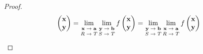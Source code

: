 \documentclass[dvipdfmx]{jsarticle}
\begin{document}
\begin{proof}
\begin{align*}
{\begin{pmatrix}
\mathbf{x} \\
\mathbf{y} \\
\end{pmatrix}} = \lim_{\scriptsize \begin{matrix} \mathbf{x} \rightarrow \mathbf{a} \\ R \rightarrow T \end{matrix}}{\lim_{\scriptsize \begin{matrix} \mathbf{y} \rightarrow \mathbf{b} \\ S \rightarrow T \end{matrix}}{f\begin{pmatrix}
\mathbf{x} \\
\mathbf{y} \\
\end{pmatrix}}} = \lim_{\scriptsize \begin{matrix} \mathbf{y} \rightarrow \mathbf{b} \\ S \rightarrow T \end{matrix}}{\lim_{\scriptsize \begin{matrix} \mathbf{x} \rightarrow \mathbf{a} \\ R \rightarrow T \end{matrix}}{f\begin{pmatrix}
\mathbf{x} \\
\mathbf{y} \\
\end{pmatrix}}}
\end{align*}
\end{proof}
\end{document}
